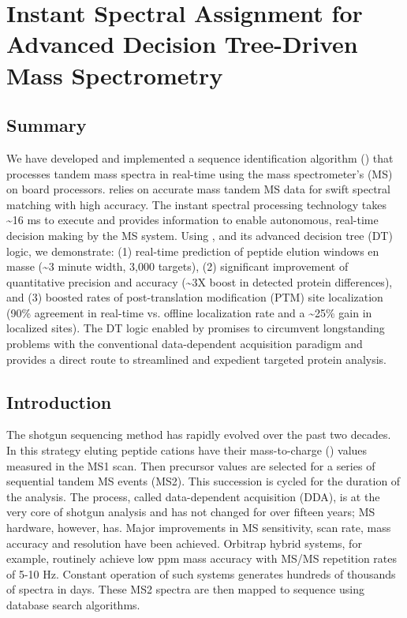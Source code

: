 \chapter{Instant Spectral Assignment for Advanced Decision Tree-Driven Mass Spectrometry}

\section{Summary}
We have developed and implemented a sequence identification algorithm (\inseq{}) that processes tandem mass spectra in real-time using the mass spectrometer's (MS) on board processors. \inseq{} relies on accurate mass tandem MS data for swift spectral matching with high accuracy. The instant spectral processing technology takes \textasciitilde16 ms to execute and provides information to enable autonomous, real-time decision making by the MS system. Using \inseq{}, and its advanced decision tree (DT) logic, we demonstrate: (1) real-time prediction of peptide elution windows en masse (\textasciitilde3 minute width, 3,000 targets), (2) significant improvement of quantitative precision and accuracy (\textasciitilde3X boost in detected protein differences), and (3) boosted rates of post-translation modification (PTM) site localization (90\% agreement in real-time vs. offline localization rate and a \textasciitilde25\% gain in localized sites). The DT logic enabled by \inseq{} promises to circumvent longstanding problems with the conventional data-dependent acquisition paradigm and provides a direct route to streamlined and expedient targeted protein analysis.

\section{Introduction}
The shotgun sequencing method has rapidly evolved over the past two decades.\cite{mudpit, bigtime} In this strategy eluting peptide cations have their mass-to-charge (\mz{}) values measured in the MS1 scan. Then precursor \mz{} values are selected for a series of sequential tandem MS events (MS2). This succession is cycled for the duration of the analysis. The process, called data-dependent acquisition (DDA), is at the very core of shotgun analysis and has not changed for over fifteen years; MS hardware, however, has. Major improvements in MS sensitivity, scan rate, mass accuracy and resolution have been achieved. Orbitrap hybrid systems, for example, routinely achieve low ppm mass accuracy with MS/MS repetition rates of 5-10 Hz.\cite{subppm,qexactive} Constant operation of such systems generates hundreds of thousands of spectra in days. These MS2 spectra are then mapped to sequence using database search algorithms.\cite{sequest,mascot,omssa}

